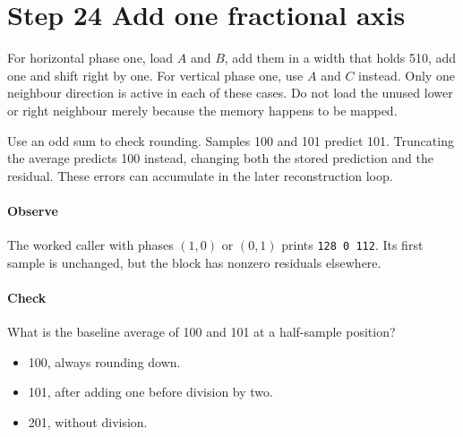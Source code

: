 \section{Step 24 Add one fractional axis}\label{h263-prediction-s04}
For horizontal phase one, load $A$ and $B$, add them in a width that holds 510,
add one and shift right by one. For vertical phase one, use $A$ and $C$ instead.
Only one neighbour direction is active in each of these cases. Do not load the
unused lower or right neighbour merely because the memory happens to be mapped.

Use an odd sum to check rounding. Samples 100 and 101 predict 101. Truncating
the average predicts 100 instead, changing both the stored prediction and the
residual. These errors can accumulate in the later reconstruction loop.

\paragraph{Observe} The worked caller with phases $(1,0)$ or $(0,1)$ prints
\texttt{128 0 112}. Its first sample is unchanged, but the block has nonzero
residuals elsewhere.
\paragraph{Check} What is the baseline average of 100 and 101 at a half-sample position?
\begin{itemize}
  \item[A.] 100, always rounding down.
  \item[B.] 101, after adding one before division by two.
  \item[C.] 201, without division.
\end{itemize}
